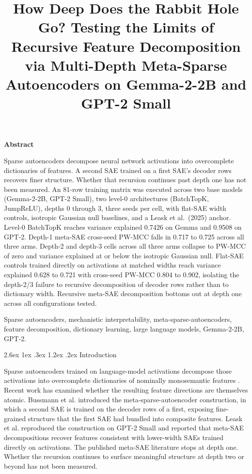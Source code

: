 \documentclass[conference]{IEEEtran}
\title{\fontsize{19pt}{23pt}\selectfont\bfseries How Deep Does the
Rabbit Hole Go? Testing the Limits of Recursive Feature Decomposition
via Multi-Depth Meta-Sparse Autoencoders on Gemma-2-2B and GPT-2 Small}
\author{%
%
  \IEEEauthorblockN{Aragorn Wang}
  \IEEEauthorblockA{%
    Colorado School of Mines\\
    \texttt{aragorn\_wang@mines.edu}%
  }%
}
\makeatletter
\renewcommand\section{\@startsection{section}{1}{\z@}%
   {2.6ex \@plus 1ex \@minus .3ex}%
   {1.2ex \@plus .2ex}%
   {\normalfont\Large\bfseries\centering}}
\renewenvironment{abstract}{%
  \par\addvspace{1.2ex}%
  \begin{center}{\normalfont\large\bfseries Abstract}\end{center}%
  \par\addvspace{0.3ex}%
  \begingroup\small\itshape\noindent\ignorespaces
}{%
  \par\endgroup\addvspace{0.8\baselineskip}%
}
\makeatother
\begin{document}
\maketitle

\begin{abstract}
Sparse autoencoders decompose neural network activations into
overcomplete dictionaries of features. A second SAE trained on a first
SAE's decoder rows recovers finer structure. Whether that recursion
continues past depth one has not been measured. An 81-row training
matrix was executed across two base models (Gemma-2-2B, GPT-2 Small),
two level-0 architectures (BatchTopK, JumpReLU), depths 0 through 3,
three seeds per cell, with flat-SAE width controls, isotropic Gaussian
null baselines, and a Leask et al.~(2025) anchor. Level-0 BatchTopK
reaches variance explained 0.7426 on Gemma and 0.9508 on GPT-2. Depth-1
meta-SAE cross-seed PW-MCC falls in 0.717 to 0.725 across all three
arms. Depth-2 and depth-3 cells across all three arms collapse to PW-MCC
of zero and variance explained at or below the isotropic Gaussian null.
Flat-SAE controls trained directly on activations at matched widths
reach variance explained 0.628 to 0.721 with cross-seed PW-MCC 0.804 to
0.902, isolating the depth-2/3 failure to recursive decomposition of
decoder rows rather than to dictionary width. Recursive meta-SAE
decomposition bottoms out at depth one across all configurations tested.
\end{abstract}

\begin{IEEEkeywords}
Sparse autoencoders, mechanistic interpretability,
meta-sparse-autoencoders, feature decomposition, dictionary learning,
large language models, Gemma-2-2B, GPT-2.
\end{IEEEkeywords}

\hypertarget{introduction}{%
\section{Introduction}\label{introduction}}

Sparse autoencoders trained on language-model activations decompose
those activations into overcomplete dictionaries of nominally
monosemantic features
\autocite{bricken2023monosemanticity,cunningham2024sparse}. Recent work
has examined whether the resulting feature directions are themselves
atomic. Bussmann et al. \autocite{bussmann2024showingsaeslearn}
introduced the meta-sparse-autoencoder construction, in which a second
SAE is trained on the decoder rows of a first, exposing fine-grained
structure that the first SAE had bundled into composite features. Leask
et al. \autocite{leask2025sparse} reproduced the construction on GPT-2
Small and reported that meta-SAE decompositions recover features
consistent with lower-width SAEs trained directly on activations. The
published meta-SAE literature stops at depth one. Whether the recursion
continues to surface meaningful structure at depth two or beyond has not
been measured.
\end{document}
